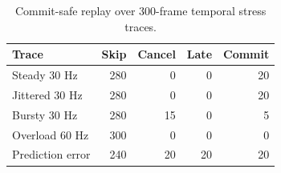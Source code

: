 \begin{table}[t]
\centering
\caption{Commit-safe replay over 300-frame temporal stress traces.}
\label{tab:deadline-traces}
\begin{tabular}{lrrrr}
\hline
Trace & Skip & Cancel & Late & Commit \\ \hline
Steady 30 Hz & 280 & 0 & 0 & 20 \\
Jittered 30 Hz & 280 & 0 & 0 & 20 \\
Bursty 30 Hz & 280 & 15 & 0 & 5 \\
Overload 60 Hz & 300 & 0 & 0 & 0 \\
Prediction error & 240 & 20 & 20 & 20 \\
\hline
\end{tabular}
\end{table}
